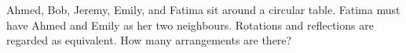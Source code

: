 Ahmed, Bob, Jeremy, Emily, and Fatima sit around a circular table. Fatima must have Ahmed and Emily as her two neighbours. Rotations and reflections are regarded as equivalent. How many arrangements are there?
